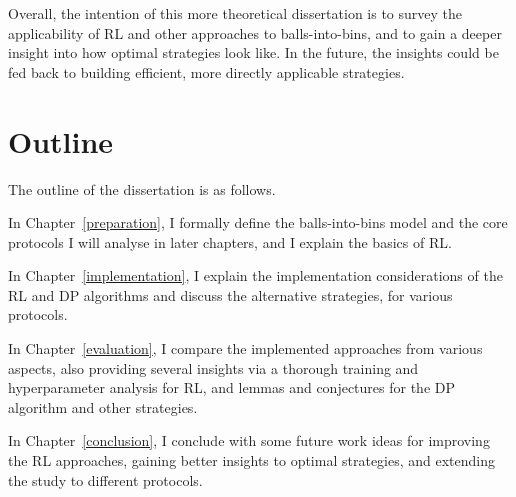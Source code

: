 Overall, the intention of this more theoretical dissertation is to survey the applicability of RL and other approaches to balls-into-bins, and to gain a deeper insight into how optimal strategies look like. In the future, the insights could be fed back to building efficient, more directly applicable strategies.


\section{Outline}

The outline of the dissertation is as follows.


In Chapter~\ref{preparation}, I formally define the balls-into-bins model and the core protocols I will analyse in later chapters, and I explain the basics of RL.


In Chapter~\ref{implementation}, I explain the implementation considerations of the RL and DP algorithms and discuss the alternative strategies, for various protocols.


In Chapter~\ref{evaluation}, I compare the implemented approaches from various aspects, also providing several insights via a thorough training and hyperparameter analysis for RL, and lemmas and conjectures for the DP algorithm and other strategies.

In Chapter~\ref{conclusion}, I conclude with some future work ideas for improving the RL approaches, gaining better insights to optimal strategies, and extending the study to different protocols.